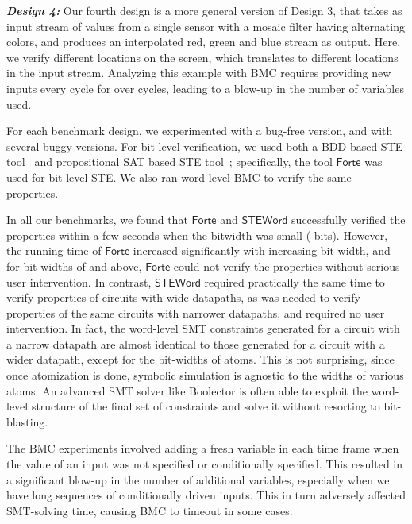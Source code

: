 \documentclass{llncs}
\newcommand{\steword}{\ensuremath{\mathsf{STEWord}}}
\newcommand{\forte}{\ensuremath{\mathsf{Forte}}}
\begin{document}
{\bfseries \emph{Design 4:}} Our fourth design is a more general
version of Design 3, that takes as input stream of values from a
single sensor with a mosaic filter having alternating colors, and
produces an interpolated red, green and blue stream as output.  Here,
we verify  different locations on the screen, which translates to
 different locations in the input stream. Analyzing this example
with BMC requires providing new inputs every cycle for over 
cycles, leading to a blow-up in the number of variables used.

For each benchmark design, we experimented with a bug-free version,
and with several buggy versions.  For bit-level verification, we used
both a BDD-based STE tool~\cite{SegerJOMABS05} and propositional SAT
based STE tool~\cite{RoordaClaessen05}; specifically, the tool
{\forte} was used for bit-level STE.  We also ran word-level BMC to
verify the same properties.

In all our benchmarks, we found that {\forte} and {\steword}
successfully verified the properties within a few seconds when the
bitwidth was small ( bits).  However, the running time of {\forte}
increased significantly with increasing bit-width, and for bit-widths
of  and above, {\forte} could not verify the properties without
serious user intervention.  In contrast, {\steword} required
practically the same time to verify properties of circuits with wide
datapaths, as was needed to verify properties of the same circuits
with narrower datapaths, and required no user intervention.  In
fact, the word-level SMT constraints generated for a circuit with a
narrow datapath are almost identical to those generated for a circuit
with a wider datapath, except for the bit-widths of atoms.  This is
not surprising, since once atomization is done, symbolic simulation is
agnostic to the widths of various atoms.  An advanced SMT solver like
Boolector is often able to exploit the word-level structure of the
final set of constraints and solve it without resorting to
bit-blasting.

The BMC experiments involved adding a fresh variable in each time
frame when the value of an input was not specified or conditionally
specified.  This resulted in a significant blow-up in the number of
additional variables, especially when we have long sequences of
conditionally driven inputs.  This in turn adversely affected
SMT-solving time, causing BMC to timeout in some cases.
\end{document}
